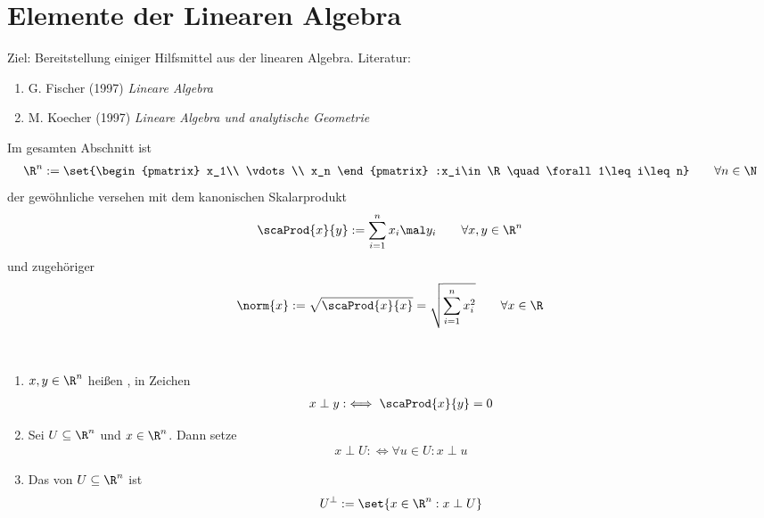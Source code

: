 
\section{Elemente der Linearen Algebra}
Ziel: Bereitstellung einiger Hilfsmittel aus der linearen Algebra.
Literatur:
\begin{enumerate}[label=(\arabic*)]
	\item G. Fischer (1997) \emph{Lineare Algebra} \cite{fischerLinAlg}
	\item M. Koecher (1997) \emph{Lineare Algebra und analytische Geometrie} \cite{koecher2013lineare}
\end{enumerate}

Im gesamten Abschnitt ist
\begin{align*}
	\R^n:=\set{\begin{pmatrix}
		x_1\\
		\vdots\\
		x_n
	\end{pmatrix}
	:x_i\in\R\quad\forall 1\leq i\leq n}\qquad\forall n\in\N
\end{align*}
der gewöhnliche  versehen mit dem kanonischen Skalarprodukt
\begin{align*}
	\scaProd{x}{y}:=\sum\limits_{i=1}^n x_i\mal y_i\qquad\forall x,y\in\R^n
\end{align*}
und zugehöriger 
\begin{align*}
	\norm{x}:=\sqrt{\scaProd{x}{x}}
	=\sqrt{\sum\limits_{i=1}^n x_i^2}
	\qquad\forall x\in\R
\end{align*}

\setcounter{satz}{-1}
\begin{definition}\label{def2.0}\
	\begin{enumerate}[label=(\arabic*)]
		\item $x,y\in\R^n$ heißen , in Zeichen
		\begin{align*}
			x\perp y:\iff\scaProd{x}{y}=0
		\end{align*}
		\item Sei $U\subseteq\R^n$ und $x\in\R^n$. Dann setze
		\begin{align*}
			x\perp U:\iff\forall u\in U: x\perp u
		\end{align*}
		\item Das  von $U\subseteq\R^n$ ist
		\begin{align*}
			U^\perp:=\set{x\in\R^n:x\perp U}
		\end{align*}
	\end{enumerate}
\end{definition}

